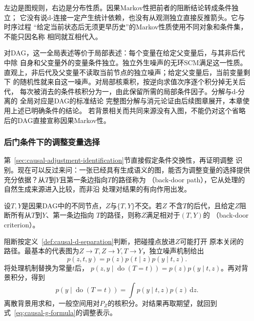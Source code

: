 左边是图规则，右边是分布性质。因果Markov性把前者的阻断结论转成条件独立；
它没有说d-连接一定产生统计依赖，也没有从观测独立直接反推箭头。它与时序过程
“给定当前状态后无须更早历史”的Markov性质使用不同对象和条件集，不能只因名称
相同就互相代入。

对DAG，这一全局表述等价于局部表述：每个变量在给定父变量后，与其非后代中除
自身和父变量外的变量条件独立。独立外生噪声的无环SCM满足这一性质。
直观上，非后代及父变量不读取当前节点的独立噪声；给定父变量后，当前变量剩下
的随机性就来自这一噪声。对局部核乘积，按逆向求值次序逐个积分掉无关后代，
每次被消去的条件核积分为一，由此保留所需的局部条件因子。分解与d-分离的
全局对应是DAG的标准结论
完整图分解与消元论证由后续图章展开，本章使用上述已明确条件的结论。
若背景相关而共同来源没有入图，不能仍对这个省略后的DAG直接宣称因果Markov性。

\subsubsection{后门条件下的调整变量选择}
\label{sec:causal-backdoor-selection}

第~\ref{sec:causal-adjustment-identification}节直接假定条件交换性，再证明调整
识别。现在可以反过来问：一张已经具有生成语义的图，能否为调整变量的选择提供
充分依据？从\(T\)到\(Y\)且第一条边指向\(T\)的路径称为
（back-door path），它从处理的自然生成来源进入比较，而非沿
处理对结果的有向作用出发。

\begin{definition}
  \label{def:causal-backdoor-criterion}
  设\(T,Y\)是因果DAG中的不同节点，\(Z\)与\(\{T,Y\}\)不交。若\(Z\)
  不含\(T\)的后代，且给定\(Z\)阻断所有从\(T\)到\(Y\)、第一条边指向
  \(T\)的路径，则称\(Z\)满足相对于\((T,Y)\)的
  （back-door criterion）。
\end{definition}

阻断按定义~\ref{def:causal-d-separation}判断，把碰撞点放进\(Z\)可能打开
原本关闭的路径。最基本的代表图为\(Z\to T,Z\to Y,T\to Y\)，独立噪声机制给出
\[
  p(z,t,y)=p(z)p(t\mid z)p(y\mid t,z).
\]
将处理机制替换为常量\(t\)后，
\(p(z,y\mid\operatorname{do}(T=t))=p(z)p(y\mid t,z)\)。再对背景积分，得到
\begin{equation}
  p(y\mid\operatorname{do}(T=t))
  =
  \int p(y\mid t,z)p(z)\,\mathrm dz.
  \label{eq:causal-backdoor-adjustment}
\end{equation}
离散背景用求和，一般空间用对\(P_Z\)的核积分。对结果再取期望，就回到
式~\eqref{eq:causal-g-formula}的调整表示。

